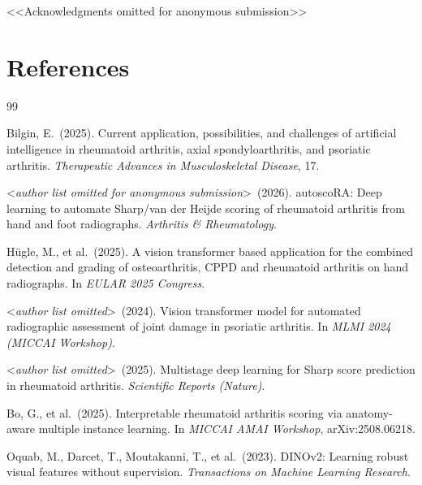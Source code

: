 \documentclass{article}
\begin{document}
\begin{ack}
\textless\textless Acknowledgments omitted for anonymous submission\textgreater\textgreater
\end{ack}

\section*{References}
{\small
\begin{thebibliography}{99}

  Bilgin, E.\ (2025).
  Current application, possibilities, and challenges of artificial intelligence in rheumatoid arthritis, axial spondyloarthritis, and psoriatic arthritis.
  {\it Therapeutic Advances in Musculoskeletal Disease}, 17.

  \textless\textit{author list omitted for anonymous submission}\textgreater\ (2026).
  autoscoRA: Deep learning to automate Sharp/van der Heijde scoring of rheumatoid arthritis from hand and foot radiographs.
  {\it Arthritis \& Rheumatology}.

  Hügle, M., et al.\ (2025).
  A vision transformer based application for the combined detection and grading of osteoarthritis, CPPD and rheumatoid arthritis on hand radiographs.
  In {\it EULAR 2025 Congress}.

  \textless\textit{author list omitted}\textgreater\ (2024).
  Vision transformer model for automated radiographic assessment of joint damage in psoriatic arthritis.
  In {\it MLMI 2024 (MICCAI Workshop)}.

  \textless\textit{author list omitted}\textgreater\ (2025).
  Multistage deep learning for Sharp score prediction in rheumatoid arthritis.
  {\it Scientific Reports (Nature)}.

  Bo, G., et al.\ (2025).
  Interpretable rheumatoid arthritis scoring via anatomy-aware multiple instance learning.
  In {\it MICCAI AMAI Workshop}, arXiv:2508.06218.

  Oquab, M., Darcet, T., Moutakanni, T., et al.\ (2023).
  DINOv2: Learning robust visual features without supervision.
  {\it Transactions on Machine Learning Research}.


\end{thebibliography}}
\end{document}
